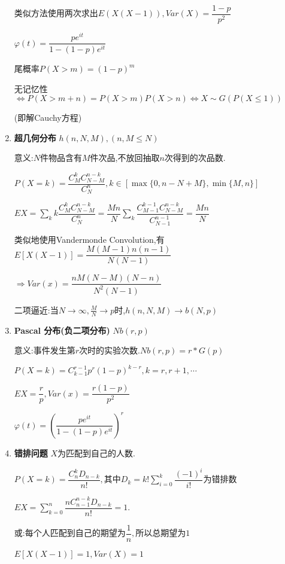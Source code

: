\begin{enumerate}
      类似方法使用两次求出$ E(X(X-1)),Var(X) = \dfrac{1-p}{p^2}$

      $ \varphi(t) = \dfrac{pe^{it}}{1-(1-p)e^{it}}$

      尾概率$ P(X>m) = (1-p)^m$

      无记忆性 $\Leftrightarrow P(X>m+n) = P(X>m)P(X>n)\Leftrightarrow X\sim G(P(X\le 1)) $

          (即解Cauchy方程)

        \item \textbf{超几何分布} $ h(n,N,M),(n, M\le N)$

          意义:$ N$件物品含有$ M$件次品,不放回抽取$ n$次得到的次品数.

          $ P(X=k) = \dfrac{C_M^kC_{N-M}^{n-k}}{C_N^n}, k \in [\max\{0, n-N + M\}, \min\{M,n\}]$

          $ EX = \sum_{k}{k\dfrac{C_M^kC_{N-M}^{n-k}}{C_N^n}}  = \dfrac{Mn}{N}\sum_{k}{\dfrac{C_{M-1}^{k-1}C_{N-M}^{n-k}}{C_{N-1}^{n-1}}} = \dfrac{Mn}{N}$

          类似地使用Vandermonde Convolution,有$ 	E[X(X-1)] = \dfrac{M(M-1)n(n-1)}{N(N-1)}$

          $\Rightarrow Var(x)  = \dfrac{nM(N-M)(N-n)}{N^2(N-1)} $

        二项逼近:当$N\to\infty, \frac{M}{N}\to p $时,$ h(n,N,M)\to b(N,p)$

      \item \textbf{Pascal 分布(负二项分布)} $ Nb(r,p)$

        意义:事件发生第$ r$次时的实验次数.$ Nb(r, p) = r * G(p) $

        $ P(X = k) = C_{k-1}^{r-1}p^r(1-p)^{k-r}, k = r,r+1,\cdots$

        $ EX = \dfrac{r}{p}, Var(x) = \dfrac{r(1-p)}{p^2}$

        $ \varphi(t) = (\dfrac{pe^{it}}{1-(1-p)e^{it}})^r$

      \item \textbf{错排问题} $ X $为匹配到自己的人数.

        $ P(X = k) = \dfrac{C_n^kD_{n-k}}{n!}, 其中D_k = k!\sum_{i=0}^{k}{\dfrac{(-1)^i}{i!}}为错排数$

        $ EX = \sum_{k=0}^n{\dfrac{nC_{n-1}^{n-k}D_{n-k}}{n!}} = 1. $

        或:每个人匹配到自己的期望为$ \dfrac{1}{n},$所以总期望为$ 1$

        $ E[X(X-1)] = 1, Var(X) = 1$
    \end{enumerate}

